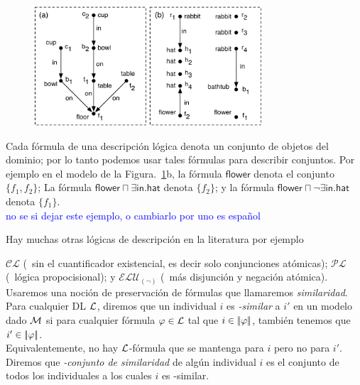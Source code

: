 \begin{figure}[ht]
\begin{center}
\includegraphics[width=8.5cm]{figures/pic-dale-haddock.pdf}\\[0pt]
\caption{}
\label{fig:dale-haddock}
\end{center}
\end{figure}


Cada f\'ormula de una descripci\'on l\'ogica denota un conjunto de objetos del dominio; por lo tanto podemos usar tales f\'ormulas para describir conjuntos. Por ejemplo en el modelo de la Figura.~\ref{fig:dale-haddock}b, la f\'ormula
$\mathsf{flower}$ denota el conjunto $\{f_1,f_2\}$; La f\'ormula
$\mathsf{flower} \sqcap \exists \mathsf{in}.\mathsf{hat}$ denota
$\{f_2\}$; y la f\'ormula $\mathsf{flower} \sqcap \neg
\exists \mathsf{in}.\mathsf{hat}$ denota $\{f_1\}$.\\

\textcolor{blue}{no se si dejar este ejemplo, o cambiarlo por uno es espa\~nol}

Hay muchas otras l\'ogicas de descripci\'on en la literatura por ejemplo 

$\mathcal{CL}$ (\el\ sin el cuantificador existencial, es decir solo conjunciones at\'omicas); $\mathcal{PL}$ (\alc\ l\'ogica propocisional); y
$\mathcal{ELU}_{(\neg)}$ (\el\ m\'as disjunci\'on y negaci\'on at\'omica).\\

Usaremos una noci\'on de preservaci\'on de f\'ormulas que llamaremos
\emph{similaridad}. Para cualquier DL $\mathcal{L}$, diremos que un individual $i$ es \emph{\gL-similar} a $i'$ en un modelo dado $\mathcal{M}$
si para cualquier f\'ormula $\varphi \in \mathcal{L}$ tal que $i \in
|\!|\varphi|\!|$, tambi\'en tenemos que $i' \in |\!|\varphi|\!|$.\\
Equivalentemente, no hay $\mathcal{L}$-f\'ormula que se mantenga para $i$ pero no para
$i'$.  Diremos que \emph{\gL-conjunto de similaridad } de alg\'un individual
$i$ es el conjunto de todos los individuales a los cuales $i$ es \gL-similar.\\

